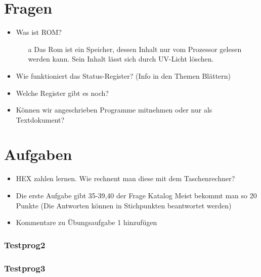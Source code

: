 \documentclass[
  ngerman
  ,12pt
  ,pdftex
]{article}
\begin{document}
  \section{Fragen}
  \begin{itemize}
    \item Was ist ROM?
    \begin{itemize}
      \item [a] Das Rom ist ein Speicher, dessen Inhalt nur vom Prozessor gelesen werden kann. Sein Inhalt lässt sich durch UV-Licht löschen.
    \end{itemize}
    \item Wie funktioniert das Status-Register? (Info in den Themen Blättern)
    \item Welche Register gibt es noch?
    \item Können wir angeschrieben Programme mitnehmen oder nur als Textdokument?
  \end{itemize}
  \section{Aufgaben}
  \begin{itemize}
    \item HEX zahlen lernen. Wie rechnent man diese mit dem Taschenrechner?
    \item Die erste Aufgabe gibt 35-39,40 der Frage Katalog
    Meist bekommt man so 20 Punkte (Die Antworten können in Stichpunkten beantwortet werden)
    \item Kommentare zu Übungsaufgabe 1 hinzufügen
  \end{itemize}


\newpage





\newpage




\subsubsection*{Testprog2}

\subsubsection*{Testprog3}

\end{document}

